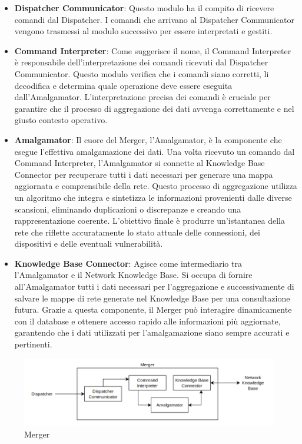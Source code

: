 \documentclass[target=bach,aauheader=,style=]{thud}
\begin{document}
\begin{itemize}
  \item \textbf{Dispatcher Communicator}: Questo modulo ha il compito di ricevere comandi dal Dispatcher. I comandi che arrivano al Dispatcher Communicator vengono trasmessi al modulo successivo per essere interpretati e gestiti.

  \item \textbf{Command Interpreter}: Come suggerisce il nome, il Command Interpreter è responsabile dell'interpretazione dei comandi ricevuti dal Dispatcher Communicator. Questo modulo verifica che i comandi siano corretti, li decodifica e determina quale operazione deve essere eseguita dall'Amalgamator. L'interpretazione precisa dei comandi è cruciale per garantire che il processo di aggregazione dei dati avvenga correttamente e nel giusto contesto operativo. 

  \item \textbf{Amalgamator}: Il cuore del Merger, l'Amalgamator, è la componente che esegue l'effettiva amalgamazione dei dati. Una volta ricevuto un comando dal Command Interpreter, l'Amalgamator si connette al Knowledge Base Connector per recuperare tutti i dati necessari per generare una mappa aggiornata e comprensibile della rete. Questo processo di aggregazione utilizza un algoritmo che integra e sintetizza le informazioni provenienti dalle diverse scansioni, eliminando duplicazioni o discrepanze e creando una rappresentazione coerente. L'obiettivo finale è produrre un'istantanea della rete che riflette accuratamente lo stato attuale delle connessioni, dei dispositivi e delle eventuali vulnerabilità.

  \item \textbf{Knowledge Base Connector}: Agisce come intermediario tra l'Amalgamator e il Network Knowledge Base. Si occupa di fornire all'Amalgamator tutti i dati necessari per l'aggregazione e successivamente di salvare le mappe di rete generate nel Knowledge Base per una consultazione futura. Grazie a questa componente, il Merger può interagire dinamicamente con il database e ottenere accesso rapido alle informazioni più aggiornate, garantendo che i dati utilizzati per l'amalgamazione siano sempre accurati e pertinenti.
\end{itemize}


\begin{figure}[t]
  \includegraphics[width=\columnwidth]{merger}
  \centering
  \caption{Merger}
  \label{merger}
\end{figure}
\end{document}

